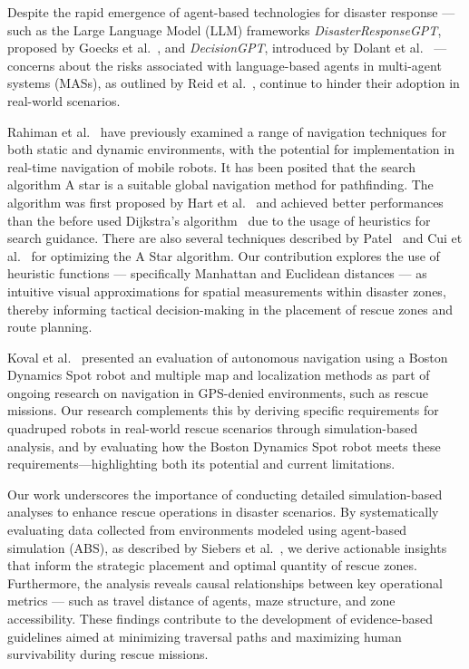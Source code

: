 \documentclass[a4paper,twoside]{article}
\begin{document}
Despite the rapid emergence of agent-based technologies for disaster response — such as the Large Language Model (LLM) frameworks \textit{DisasterResponseGPT}, proposed by Goecks et al.\ \cite{goecks2023disasterresponsegpt}, and \textit{DecisionGPT}, introduced by Dolant et al.\ \cite{dolant2025agentic} — concerns about the risks associated with language-based agents in multi-agent systems (MASs), as outlined by Reid et al.\ \cite{reid2025risk}, continue to hinder their adoption in real-world scenarios. 

Rahiman et al.\ \cite{gul2019comprehensive} have previously examined a range of navigation techniques for both static and dynamic environments, with the potential for implementation in real-time navigation of mobile robots. It has been posited that the search algorithm A star is a suitable global navigation method for pathfinding. The algorithm was first proposed by Hart et al.\ \cite{hart1968formal} and achieved better performances than the before used Dijkstra's algorithm\ \cite{Dijkstra1959Note} due to the usage of heuristics for search guidance. There are also several techniques described by Patel\ \cite{Patel2025Variants} and Cui et al.\ \cite{cui2011based} for optimizing the A Star algorithm. Our contribution explores the use of heuristic functions — specifically Manhattan and Euclidean distances — as intuitive visual approximations for spatial measurements within disaster zones, thereby informing tactical decision-making in the placement of rescue zones and route planning.

Koval et al.\ \cite{koval2022navigation} presented an evaluation of autonomous navigation using a Boston Dynamics Spot robot and multiple map and localization methods as part of ongoing research on navigation in GPS-denied environments, such as rescue missions. Our research complements this by deriving specific requirements for quadruped robots in real-world rescue scenarios through simulation-based analysis, and by evaluating how the Boston Dynamics Spot robot meets these requirements—highlighting both its potential and current limitations.

Our work underscores the importance of conducting detailed simulation-based analyses to enhance rescue operations in disaster scenarios. By systematically evaluating data collected from environments modeled using agent-based simulation (ABS), as described by Siebers et al.\ \cite{siebers2008introduction}, we derive actionable insights that inform the strategic placement and optimal quantity of rescue zones. Furthermore, the analysis reveals causal relationships between key operational metrics — such as travel distance of agents, maze structure, and zone accessibility. These findings contribute to the development of evidence-based guidelines aimed at minimizing traversal paths and maximizing human survivability during rescue missions.
\end{document}
